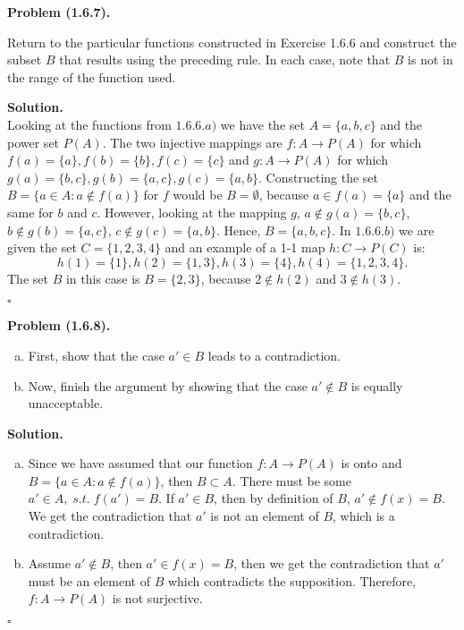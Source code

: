 \documentclass[12pt]{article}
\theoremstyle{definition}
\theoremstyle{remark}
\newenvironment{problem}[1]{
    \vspace{1em}
    \noindent
    \textbf{Problem #1.} 
}{
    \vspace{1em}
}
\newenvironment{solution}{
    \noindent
    \textbf{Solution.}\\
}{
    \quad \hfill $\square$
    \vspace{1em}
}
\begin{document}
\begin{problem}{(1.6.7)}
Return to the particular functions constructed in Exercise 1.6.6 and 
construct the subset \(B\) that results using the preceding rule. 
In each case, note that \(B\) is not in the range of the function used.
\end{problem}

\begin{solution}
Looking at the functions from $1.6.6.a)$ we have the set $A = \{a, b, c\}$ and the power set $P(A)$. The two injective mappings are $f:A\rightarrow{P(A)}$ for which $f(a)=\{a\}, f(b)=\{b\}, f(c)=\{c\}$ and $g:A\rightarrow{P(A)}$ for which $g(a)=\{b, c\}, g(b)=\{a, c\}, g(c)=\{a, b\}$. Constructing the set $B=\{a \in A:a \notin f(a)\}$ for $f$ would be $B=\emptyset$, because $a \in f(a)=\{a\}$ and the same for $b$ and $c$. However, looking at the mapping $g$, $a \notin g(a)=\{b, c\}$,  $b \notin g(b)=\{a, c\}$, $c \notin g(c)=\{a, b\}$. Hence, $B=\{a, b, c\}$.
In $1.6.6.b)$ we are given the set $C=\{1, 2, 3, 4\}$ and an example of a 1-1 map $h:C\rightarrow{P(C)}$ is: $$h(1) = \{1\}, 
h(2) = \{1, 3\}, h(3) = \{4\}, h(4) = \{1, 2, 3, 4\}.$$ The set $B$ in this case is $B=\{2, 3\}$, because $2 \notin h(2)$ and $3 \notin h(3)$.
\end{solution}

\begin{problem}{(1.6.8)}
\begin{enumerate}[(a)] \item First, show that the case \(a' \in B\) leads to a contradiction.
    \item Now, finish the argument by showing that the case \(a' \notin B\) 
          is equally unacceptable.
\end{enumerate}
\end{problem}

\begin{solution}
\begin{enumerate}[(a)] \item  Since we have assumed that our function $f: A\rightarrow{P(A)}$ is onto and $B = \{a \in A: a \notin f(a)\}$, then $B \subset A$. There must be some $a' \in A, \; s.t. \; f(a')=B$. If $a' \in B$, then by definition of $B$, $a' \notin f(x)=B$. We get the contradiction that $a'$ is not an element of $B$, which is a contradiction. 


    \item Assume $a' \notin B$, then $a' \in f(x)=B$, then we get the contradiction that $a'$ must be an element of $B$ which contradicts the supposition. Therefore, $f: A \rightarrow{P(A)}$ is not surjective.
\end{enumerate}
\end{solution}


\printbibliography
\end{document}
